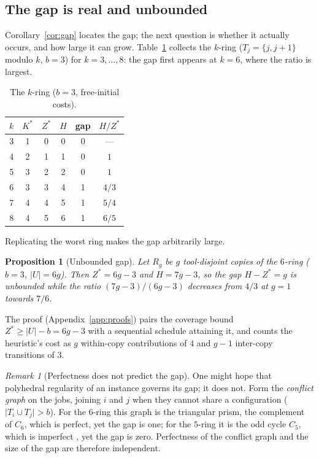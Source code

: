 \documentclass[11pt,a4paper]{article}
\theoremstyle{plain}
\newtheorem{proposition}{Proposition}
\theoremstyle{definition}
\theoremstyle{remark}
\newtheorem{remark}{Remark}
\newcommand{\U}{U}
\newcommand{\Kst}{K^{\ast}}
\newcommand{\Zst}{Z^{\ast}}
\begin{document}
\subsection{The gap is real and unbounded}\label{ssec:unbounded}
Corollary~\ref{cor:gap} locates the gap; the next question is whether it actually
occurs, and how large it can grow. Table~\ref{tab:rings} collects the $k$-ring
($T_j=\{j,j+1\}$ modulo $k$, $b=3$) for $k=3,\dots,8$: the gap first appears at
$k=6$, where the ratio is largest.
\begin{table}[h]\centering
\begin{tabular}{cccccc}
\toprule
$k$ & $\Kst$ & $\Zst$ & $H$ & gap & $H/\Zst$\\
\midrule
3 & 1 & 0 & 0 & 0 & ---\\
4 & 2 & 1 & 1 & 0 & $1$\\
5 & 3 & 2 & 2 & 0 & $1$\\
6 & 3 & 3 & 4 & 1 & $4/3$\\
7 & 4 & 4 & 5 & 1 & $5/4$\\
8 & 4 & 5 & 6 & 1 & $6/5$\\
\bottomrule
\end{tabular}
\caption{The $k$-ring ($b=3$, free-initial costs).}\label{tab:rings}
\end{table}
Replicating the worst ring makes the gap arbitrarily large.
\begin{proposition}[Unbounded gap]\label{prop:unbounded}
Let $R_g$ be $g$ tool-disjoint copies of the $6$-ring ($b=3$, $\lvert\U\rvert=6g$).
Then $\Zst=6g-3$ and $H=7g-3$, so the gap $H-\Zst=g$ is unbounded while the ratio
$(7g-3)/(6g-3)$ decreases from $4/3$ at $g=1$ towards $7/6$.
\end{proposition}
The proof (Appendix~\ref{app:proofs}) pairs the coverage bound $\Zst\ge\lvert\U
\rvert-b=6g-3$ with a sequential schedule attaining it, and counts the heuristic's
cost as $g$ within-copy contributions of $4$ and $g-1$ inter-copy transitions of
$3$.
\begin{remark}[Perfectness does not predict the gap]\label{rem:perfect}
One might hope that polyhedral regularity of an instance governs its gap; it does
not. Form the \emph{conflict graph} on the jobs, joining $i$ and $j$ when they cannot
share a configuration ($\lvert T_i\cup T_j\rvert>b$). For the $6$-ring this graph is
the triangular prism, the complement of $C_6$, which is perfect, yet the gap is one;
for the $5$-ring it is the odd cycle $C_5$, which is imperfect
\citep{Chudnovsky2006}, yet the gap is zero. Perfectness of the conflict graph and
the size of the gap are therefore independent.
\end{remark}
\end{document}
